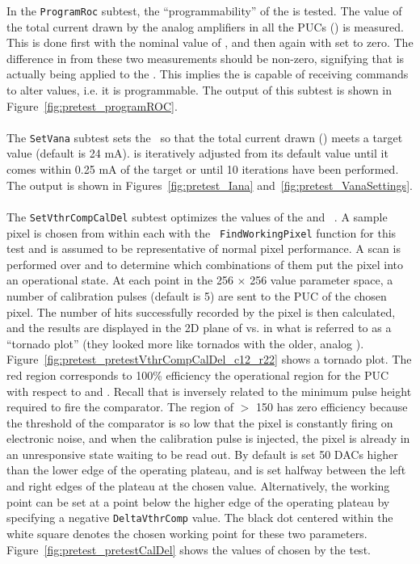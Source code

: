 In the {\tt ProgramRoc} subtest, the ``programmability'' of the \roc is tested.
The value of the total current drawn by the analog amplifiers in all the PUCs (\iana) is measured.
This is done first with the nominal value of \vana, and then again with \vana set to zero.
The difference in \iana from these two measurements should be non-zero,
signifying that \vana is actually being applied to the \roc.
This implies the \roc is capable of receiving commands to alter \dac values, i.e. it is programmable.
The output of this subtest is shown in Figure~\ref{fig:pretest_programROC}.
\\\\
The {\tt SetVana} subtest sets the \vana~\dac so that the total current drawn (\iana) meets a target value (default is 24 mA).
\vana is iteratively adjusted from its default value until it comes within 0.25 mA of the target 
or until 10 iterations have been performed.  The output is shown in Figures~\ref{fig:pretest_Iana} and~\ref{fig:pretest_VanaSettings}.
\\\\
The {\tt SetVthrCompCalDel} subtest optimizes the values of the \vthrcomp and \caldel~\dacs.
A sample pixel is chosen from within each \roc with the {\tt
  FindWorkingPixel} function for this test and is assumed to be representative of normal pixel performance.
A scan is performed over \vthrcomp and \caldel to determine which combinations of them put the pixel into an operational state.
At each point in the 256 $\times$ 256 value parameter space,
a number of calibration pulses (default is 5) are sent to the PUC of the chosen pixel.
The number of hits successfully recorded by the pixel is then calculated,
and the results are displayed in the 2D plane of \vthrcomp vs. \caldel 
in what is referred to as a ``tornado plot'' (they looked more like tornados with the older, analog \roc).
Figure~\ref{fig:pretest_pretestVthrCompCalDel_c12_r22} shows a tornado plot.
The red region corresponds to 100\% efficiency \textendash\xspace 
the operational region for the PUC with respect to \vthrcomp and \caldel.
Recall that \vthrcomp is inversely related to the minimum pulse height required to fire the comparator.
The region of \vthrcomp $>$ 150 has zero efficiency because
the threshold of the comparator is so low that the pixel is constantly firing on electronic noise,
and when the calibration pulse is injected,
the pixel is already in an unresponsive state waiting to be read out.
By default \vthrcomp is set 50 DACs higher than the lower edge of the operating plateau,
and \caldel is set halfway between the left and right edges of the
plateau at the chosen \vthrcomp value. Alternatively, the working
point can be set at a point below the higher edge of the operating
plateau by specifying a negative {\tt DeltaVthrComp} value.
The black dot centered within the white square denotes the chosen working point for these two parameters.
Figure~\ref{fig:pretest_pretestCalDel} shows the values of \caldel chosen by the test.

